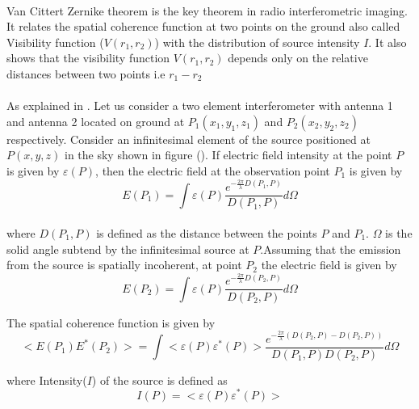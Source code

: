 \paragraph{}Van Cittert \textendash Zernike theorem is the key theorem in radio interferometric imaging.
 It relates the spatial coherence function at two points on the ground also called Visibility function ($V(r_1,r_2)$)
 with the distribution of source intensity $I$. It also shows that the visibility function $V(r_1,r_2)$ depends only on the 
relative distances between two points i.e $r_1-r_2$

\paragraph{}As explained in \cite{ncrabookchap2}. Let us consider a two element interferometer with antenna 1 and antenna 2 
located on ground at $P_1(x_1,y_1,z_1)$ and $P_2(x_2,y_2,z_2)$ respectively. 
Consider an infinitesimal element of the source positioned at $P(x,y,z)$ in the sky shown in figure ().
If electric field intensity at the point $P$ is given by $\varepsilon(P)$, then the electric field at
the observation point $P_1$ \cite{wolf} is given by
\begin{equation}
 E(P_1) = \int \varepsilon(P) \frac{e^{-\frac{2\pi}{\lambda}D(P_1,P)}} {D(P_1,P)}d\Omega
\label{2.2}
\end{equation}
\paragraph{}where $D(P_1,P)$ is defined as the distance between the points $P$ and $P_1$. $\Omega$ is the solid 
angle subtend by the infinitesimal source at $P$.Assuming that the emission from the source is spatially incoherent,
at point $P_2$ the electric field is given by
\begin{equation}
 E(P_2) = \int \varepsilon(P) \frac{e^{-\frac{2\pi}{\lambda}D(P_2,P)}} {D(P_2,P)}d\Omega
\label{2.3}
\end{equation}

The spatial coherence function is given by
\begin{equation}
 < E(P_1)E^*(P_2)> = \int <\varepsilon(P)\varepsilon^*(P)> \frac{e^{-\frac{2\pi}{\lambda}(D(P_2,P)-D(P_2,P))}} {D(P_1,P) D(P_2,P)}d\Omega
\label{2.4}
\end{equation}

where Intensity($I$) of the source is defined as 
\begin{equation}
 I(P)=<\varepsilon(P)\varepsilon^*(P)>
\label{2.5}
\end{equation}

